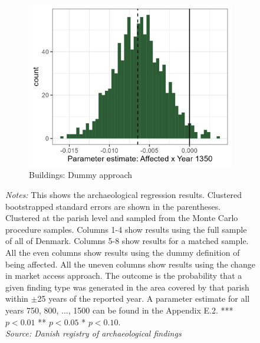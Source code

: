 \documentclass[11pt]{article}
\begin{document}
\begin{figure}
\begin{subfigure}[b]{0.45\textwidth}
        \centering
        \caption{Buildings: Dummy approach} \label{fig:distri_d}
        \includegraphics[width=\textwidth]{Plots/Regression_plots/arch_dummy_buildings_boot.png}
    \end{subfigure}
    \parbox{1\textwidth}{
\caption*{\footnotesize \textit{Notes:} This shows the archaeological regression results. Clustered bootstrapped standard errors are shown in the parentheses. Clustered at the parish level and sampled from the Monte Carlo procedure samples. Columns 1-4 show results using the full sample of all of Denmark. Columns 5-8 show results for a matched sample. All the even columns show results using the dummy definition of being affected. All the uneven columns show results using the change in market access approach. The outcome is the probability that a given finding type was generated in the area covered by that parish within $\pm$25 years of the reported year. A parameter estimate for all years 750, 800, ..., 1500 can be found in the Appendix E.2. *** $p< 0.01$ ** $p< 0.05$ * $p< 0.10$. \\ \textit{Source: Danish registry of archaeological findings}}
}
    \label{fig:arch_reg_boot}
\end{figure}
\end{document}
